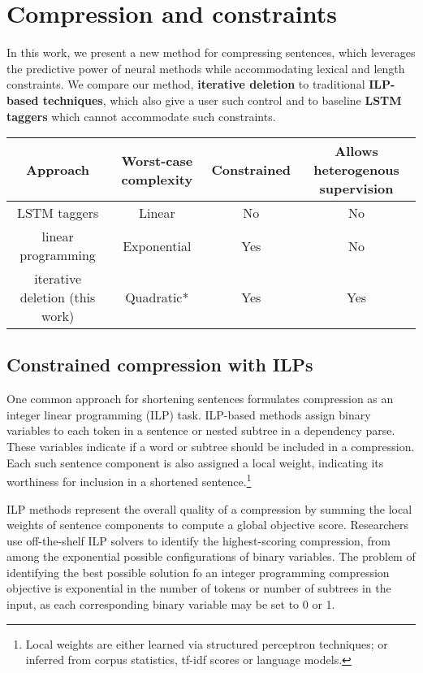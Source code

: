 \documentclass[11pt,a4paper]{article}
\begin{document}
\section{Compression and constraints}

In this work, we present a new method for compressing sentences, which leverages the predictive power of neural methods while accommodating lexical and length constraints. We compare our method, \textbf{iterative deletion} to traditional \textbf{ILP-based techniques}, which also give a user such control and to baseline \textbf{LSTM taggers} which cannot accommodate such constraints.


\begin{table*}[htb!]
\begin{tabular}{cccc}
\textbf{Approach} & \textbf{Worst-case complexity} & \textbf{Constrained} & \textbf{Allows heterogenous supervision} \\ \hline
LSTM taggers      & Linear              & No     &    No      \\   
linear programming              & Exponential         & Yes    &    No   \\
iterative deletion (this work)       & Quadratic*           & Yes    &      Yes   \\
\end{tabular}
\end{table*}

\subsection{Constrained compression with ILPs}

One common approach for shortening sentences formulates compression as an integer linear programming (ILP) task. ILP-based methods assign binary variables to each token in a sentence or nested subtree in a dependency parse. These variables indicate if a word or subtree should be included in a compression. Each such sentence component is also assigned a local weight, indicating its worthiness for inclusion in a shortened sentence.\footnote{Local weights are either learned via structured perceptron techniques; or inferred from corpus statistics, tf-idf scores or language models.}

ILP methods represent the overall quality of a compression by summing the local weights of sentence components to compute a global objective score. Researchers use off-the-shelf ILP solvers to identify the highest-scoring compression, from among the exponential possible configurations of binary variables. The problem of identifying the best possible solution fo an integer programming compression objective is exponential in the number of tokens or number of subtrees in the input, as each corresponding binary variable may be set to 0 or 1.
\end{document}

